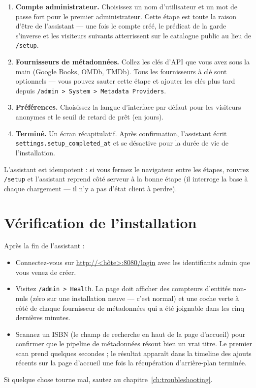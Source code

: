 \begin{enumerate}
  \item \textbf{Compte administrateur.} Choisissez un nom
        d'utilisateur et un mot de passe fort pour le premier
        administrateur. Cette étape est toute la raison d'être de
        l'assistant — une fois le compte créé, le prédicat de la
        garde s'inverse et les visiteurs suivants atterrissent sur
        le catalogue public au lieu de \texttt{/setup}.
  \item \textbf{Fournisseurs de métadonnées.} Collez les clés d'API
        que vous avez sous la main (Google Books, OMDb, TMDb). Tous
        les fournisseurs à clé sont optionnels — vous pouvez sauter
        cette étape et ajouter les clés plus tard depuis
        \texttt{/admin > System > Metadata Providers}.
  \item \textbf{Préférences.} Choisissez la langue d'interface par
        défaut pour les visiteurs anonymes et le seuil de retard de
        prêt (en jours).
  \item \textbf{Terminé.} Un écran récapitulatif. Après confirmation,
        l'assistant écrit \texttt{settings.setup\_completed\_at} et
        se désactive pour la durée de vie de l'installation.
\end{enumerate}

L'assistant est idempotent : si vous fermez le navigateur entre les
étapes, rouvrez \texttt{/setup} et l'assistant reprend côté serveur à
la bonne étape (il interroge la base à chaque chargement — il n'y a
pas d'état client à perdre).

\section{Vérification de l'installation}

Après la fin de l'assistant :

\begin{itemize}
  \item Connectez-vous sur \url{http://<hôte>:8080/login} avec les
        identifiants admin que vous venez de créer.
  \item Visitez \texttt{/admin > Health}. La page doit afficher des
        compteurs d'entités non-nuls (zéro sur une installation
        neuve — c'est normal) et une coche verte à côté de chaque
        fournisseur de métadonnées qui a été joignable dans les
        cinq dernières minutes.
  \item Scannez un ISBN (le champ de recherche en haut de la page
        d'accueil) pour confirmer que le pipeline de métadonnées
        résout bien un vrai titre. Le premier scan prend quelques
        secondes ; le résultat apparaît dans la timeline des ajouts
        récents sur la page d'accueil une fois la récupération
        d'arrière-plan terminée.
\end{itemize}

Si quelque chose tourne mal, sautez au
chapitre~\ref{ch:troubleshooting}.
